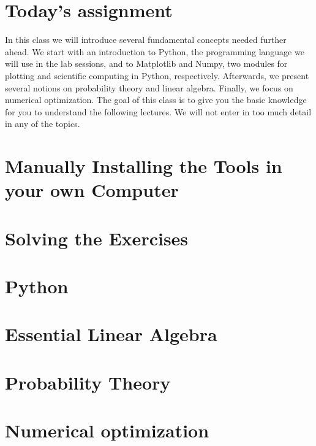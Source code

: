 
\section{Today's assignment}

In this class we will introduce several fundamental concepts needed further
ahead. We start with an introduction to Python, the programming language we
will use in the lab sessions, and to Matplotlib and Numpy, two modules for
plotting and scientific computing in Python, respectively. Afterwards, we
present several notions on probability theory and linear algebra. Finally, we
focus on numerical optimization. The goal of this class is to give you the
basic knowledge for you to understand the following lectures. We will not enter
in too much detail in any of the topics.  

\section{Manually Installing the Tools in your own Computer}


\section{Solving the Exercises}
\label{sec:SolvingExercises}


\section{Python}
\label{sec:Python}


\section{Essential Linear Algebra}


\section{Probability Theory}


\section{Numerical optimization\label{numerical_optimization}}

